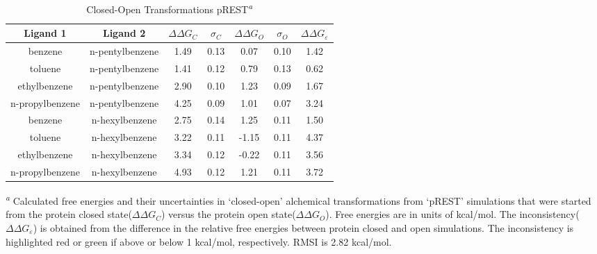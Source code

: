 \begin{table}[!htb]
\centering
\caption{Closed-Open Transformations pREST\textsuperscript{\emph{a}}}
\label{tbl:C-O_pREST}
\begin{tabular}{|c|c|c|c|c|c|c|}
\hline
\textbf{Ligand 1}       & \textbf{Ligand 2}    & \boldmath$\Delta\Delta G_{C}$ & \boldmath$\sigma_{C}$ & \boldmath$\Delta\Delta G_{O}$ & \boldmath$\sigma_{O}$ & \boldmath$\Delta\Delta G_{\varepsilon}$\\ \hline
benzene         & n-pentylbenzene & 1.49       & 0.13     & 0.07   & 0.10     & \cellcolor[HTML]{FFCCC9}1.42 \\ \hline
toluene         & n-pentylbenzene & 1.41       & 0.12     & 0.79   & 0.13     & \cellcolor[HTML]{9AFF99}0.62 \\ \hline
ethylbenzene    & n-pentylbenzene & 2.90       & 0.10     & 1.23   & 0.09     & \cellcolor[HTML]{FFCCC9}1.67 \\ \hline
n-propylbenzene & n-pentylbenzene & 4.25       & 0.09     & 1.01   & 0.07     & \cellcolor[HTML]{FFCCC9}3.24 \\ \hline
benzene         & n-hexylbenzene  & 2.75       & 0.14     & 1.25   & 0.11     & \cellcolor[HTML]{FFCCC9}1.50 \\ \hline
toluene         & n-hexylbenzene  & 3.22       & 0.11     & -1.15  & 0.11     & \cellcolor[HTML]{FFCCC9}4.37 \\ \hline
ethylbenzene    & n-hexylbenzene  & 3.34       & 0.12     & -0.22  & 0.11     & \cellcolor[HTML]{FFCCC9}3.56 \\ \hline
n-propylbenzene & n-hexylbenzene  & 4.93       & 0.12     & 1.21   & 0.11     & \cellcolor[HTML]{FFCCC9}3.72 \\ \hline
\end{tabular}

\textsuperscript{\emph{a}} Calculated free energies and their uncertainties in `closed-open' alchemical transformations from `pREST' simulations that were started from the protein closed state(\boldmath$\Delta\Delta G_{C}$) versus the protein open state(\boldmath$\Delta\Delta G_{O}$).
Free energies are in units of kcal/mol. 
The inconsistency(\boldmath$\Delta\Delta G_{\varepsilon}$) is obtained from the difference in the relative free energies between protein closed and open simulations. 
The inconsistency is highlighted red or green if above or below 1 kcal/mol, respectively.
RMSI is 2.82 kcal/mol. 
\end{table}

